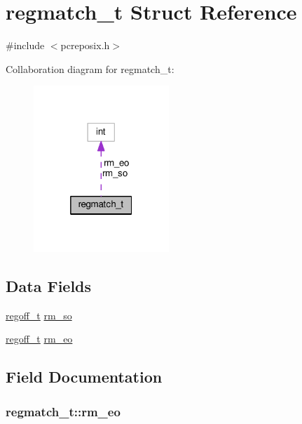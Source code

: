 \hypertarget{structregmatch__t}{}\section{regmatch\+\_\+t Struct Reference}
\label{structregmatch__t}


{\ttfamily \#include $<$pcreposix.\+h$>$}



Collaboration diagram for regmatch\+\_\+t\+:
\nopagebreak
\begin{figure}[H]
\begin{center}
\leavevmode
\includegraphics[width=145pt]{structregmatch__t__coll__graph}
\end{center}
\end{figure}
\subsection*{Data Fields}
\begin{DoxyCompactItemize}
\item 
\hyperlink{pcreposix_8h_a5b34995b47432512ee4ffa32b836e65f}{regoff\+\_\+t} \hyperlink{structregmatch__t_a90ac8973d256eaffdbb20de676ff45a4}{rm\+\_\+so}
\item 
\hyperlink{pcreposix_8h_a5b34995b47432512ee4ffa32b836e65f}{regoff\+\_\+t} \hyperlink{structregmatch__t_a728c28b9b23fa28c4e0b90e3a1a29efc}{rm\+\_\+eo}
\end{DoxyCompactItemize}


\subsection{Field Documentation}
\subsubsection[{\texorpdfstring{rm\+\_\+eo}{rm_eo}}]{ regmatch\+\_\+t\+::rm\+\_\+eo}\hypertarget{structregmatch__t_a728c28b9b23fa28c4e0b90e3a1a29efc}{}\label{structregmatch__t_a728c28b9b23fa28c4e0b90e3a1a29efc}
